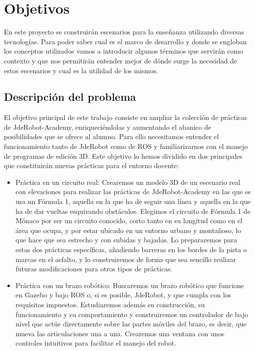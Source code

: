 \chapter{Objetivos}
\label{ch:Objetivos}

En este proyecto se construirán escenarios para la enseñanza utilizando diversas tecnologías. Para poder saber cual es el marco de desarrollo y donde se engloban los conceptos utilizados vamos a introducir algunos términos que servirán como contexto y que nos permitirán entender mejor de dónde surge la necesidad de estos escenarios y cual es la utilidad de los mismos.

\section{Descripción del problema}
\label{sec:obj_descripcionproblema}

El objetivo principal de este trabajo consiste en ampliar la colección de prácticas de JdeRobot-Academy, enriqueciéndolas y aumentando el abanico de posibilidades que se ofrece al alumno. Para ello necesitamos entender el funcionamiento tanto de JdeRobot como de ROS y familiarizarnos con el manejo de programas de edición 3D. Este objetivo lo hemos dividido en dos principales que constituirán nuevas prácticas para el entorno docente:
\begin{itemize}
	\item Práctica en un circuito real: Crearemos un modelo 3D de un escenario real con elevaciones para realizar las prácticas de JdeRobot-Academy en las que se usa un Fórmula 1, aquella en la que ha de seguir una línea y aquella en la que ha de dar vueltas esquivando obstáculos. Elegimos el circuito de Fórmula 1 de Mónaco por ser un circuito conocido, corto tanto en su longitud como en el área que ocupa, y por estar ubicado en un entorno urbano y montañoso, lo que hace que sea estrecho y con subidas y bajadas. Lo prepararemos para estas dos prácticas específicas, añadiendo barreras en los bordes de la pista o marcas en el asfalto, y lo construiremos de forma que sea sencillo realizar futuras modificaciones para otros tipos de prácticas.
	
	\item Práctica con un brazo robótico: Buscaremos un brazo robótico que funcione en Gazebo y bajo ROS o, si es posible, JdeRobot, y que cumpla con los requisitos impuestos. Estudiaremos además su construcción, su funcionamiento y su comportamiento y construiremos un controlador de bajo nivel que actúe directamente sobre las partes móviles del brazo, es decir, que mueva las articulaciones una a una. Crearemos una ventana con unos controles intuitivos para facilitar el manejo del robot.
\end{itemize}


